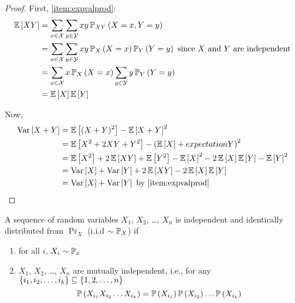 \begin{proof}
    First, \cref{item:expvalprod}:
    \begin{align*}\expectation{XY}
         & = \sum_{x\in\mathcal{X}}\sum_{y\in\mathcal{Y}}xy\prob[XY]{X=x, Y=y}                                                 \\
         & = \sum_{x\in\mathcal{X}}\sum_{y\in\mathcal{Y}}xy\prob[X]{X=x}\prob[Y]{Y=y}\hbox{ since $X$ and $Y$ are independent} \\
         & = \sum_{x\in\mathcal{X}}x\prob[X]{X=x}\sum_{y\in\mathcal{Y}}y\prob[Y]{Y=y}                                          \\
         & = \expectation{X}\expectation{Y}
    \end{align*}

    Now,
    \begin{align*}\variance{X + Y}
         & = \expectation{(X + Y)^2} - \expectation{X + Y}^2                                                                                     \\
         & = \expectation{X^2 + 2XY + Y^2} - \left(\expectation{X} + expectation{Y}\right)^2                                                     \\
         & = \expectation{X^2} + 2\expectation{XY} + \expectation{Y^2} - \expectation{X}^2 - 2\expectation{X}\expectation{Y} - \expectation{Y}^2 \\
         & = \variance{X} + \variance{Y} + 2\expectation{XY} - 2\expectation{X}\expectation{Y}                                                   \\
         & = \variance{X} + \variance{Y} \hbox{ by \cref{item:expvalprod}}\qedhere
    \end{align*}
\end{proof}

\begin{definition}
    A sequence of random variables $X_1$, $X_2$, \dots, $X_n$ is independent and
    identically distributed from $\Pr_X$ (i.i.d $\sim \mathbb{P}_X$) if
    \begin{enumerate}[label=(\arabic*)]
        \item for all $i$, $X_i \sim \mathbb{P}_x$
        \item $X_1$, $X_2$, \dots, $X_n$ are mutually independent, i.e., for any
              $\left\lbrace i_1, i_2, \dots, i_k\right\rbrace \subseteq \left\lbrace1, 2, \dots, n\right\rbrace$
              \[\prob{X_{i_1}X_{i_2} \dots X_{i_k}} = \prob{X_{i_1}}\prob{X_{i_2}} \dots \prob{X_{i_k}}\]
    \end{enumerate}
\end{definition}

